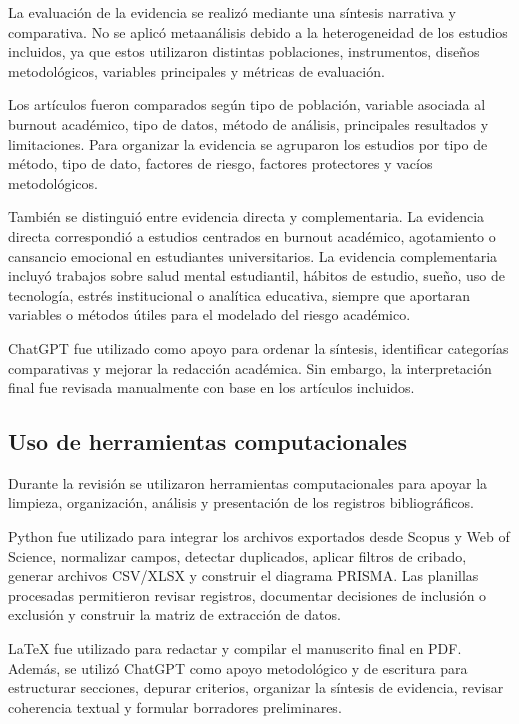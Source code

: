 \documentclass[12pt,a4paper]{article}
\begin{document}
La evaluación de la evidencia se realizó mediante una síntesis narrativa y comparativa. No se aplicó metaanálisis debido a la heterogeneidad de los estudios incluidos, ya que estos utilizaron distintas poblaciones, instrumentos, diseños metodológicos, variables principales y métricas de evaluación.

Los artículos fueron comparados según tipo de población, variable asociada al burnout académico, tipo de datos, método de análisis, principales resultados y limitaciones. Para organizar la evidencia se agruparon los estudios por tipo de método, tipo de dato, factores de riesgo, factores protectores y vacíos metodológicos.

También se distinguió entre evidencia directa y complementaria. La evidencia directa correspondió a estudios centrados en burnout académico, agotamiento o cansancio emocional en estudiantes universitarios. La evidencia complementaria incluyó trabajos sobre salud mental estudiantil, hábitos de estudio, sueño, uso de tecnología, estrés institucional o analítica educativa, siempre que aportaran variables o métodos útiles para el modelado del riesgo académico.

ChatGPT fue utilizado como apoyo para ordenar la síntesis, identificar categorías comparativas y mejorar la redacción académica. Sin embargo, la interpretación final fue revisada manualmente con base en los artículos incluidos.

\subsection{Uso de herramientas computacionales}

Durante la revisión se utilizaron herramientas computacionales para apoyar la limpieza, organización, análisis y presentación de los registros bibliográficos.

Python fue utilizado para integrar los archivos exportados desde Scopus y Web of Science, normalizar campos, detectar duplicados, aplicar filtros de cribado, generar archivos CSV/XLSX y construir el diagrama PRISMA. Las planillas procesadas permitieron revisar registros, documentar decisiones de inclusión o exclusión y construir la matriz de extracción de datos.

LaTeX fue utilizado para redactar y compilar el manuscrito final en PDF. Además, se utilizó ChatGPT como apoyo metodológico y de escritura para estructurar secciones, depurar criterios, organizar la síntesis de evidencia, revisar coherencia textual y formular borradores preliminares.
\end{document}
